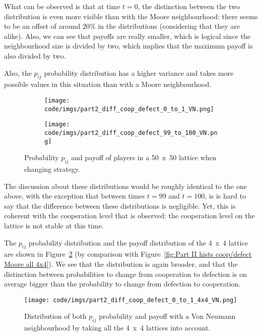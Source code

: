 \documentclass{article}
\begin{document}
What can be observed is that at time $t=0$, the distinction between the two distribution is even more visible
than with the Moore neighbourhood: there seems to be an offset of around $20\%$ in the distributions (considering
that they are alike). Also, we can see that payoffs are really smaller, which is logical since the neighbourhood
size is divided by two, which implies that the maximum payoff is also divided by two.

Also, the $p_{ij}$ probability distribution has a higher variance and takes more possible values in this situation
than with a Moore neighbourhood.

\begin{figure}
	\begin{subfigure}{\textwidth}
		\texttt{[image: code/imgs/part2\_diff\_coop\_defect\_0\_to\_1\_VN.png]}
	\end{subfigure}
	\begin{subfigure}{\textwidth}
		\texttt{[image: code/imgs/part2\_diff\_coop\_defect\_99\_to\_100\_VN.png]}
	\end{subfigure}
	\caption{Probability $p_{ij}$ and payoff of players in a 50~x~50 lattice when changing strategy.\label{fig:9}}
\end{figure}

The discussion about these distributions would be roughly identical to the one above, with the exception that
between times $t=99$ and $t=100$, is is hard to say that the difference between these distributions is negligible.
Yet, this is coherent with the cooperation level that is observed: the cooperation level on the lattice is
not stable at this time.

The $p_{ij}$ probability distribution and the payoff distribution of the 4~x~4 lattice are shown in
Figure~\ref{fig:hists coop/defect 4x4 VN} (by comparison with Figure~\ref{fig:Part II hists coop/defect Moore all 4x4}).
We see that the distribution is again broader, and that the distinction between probabilities to change from
cooperation to defection is on average bigger than the probability to change from defection to cooperation.

\begin{figure}[!t]
\hspace{-1.8cm}
\texttt{[image: code/imgs/part2\_diff\_coop\_defect\_0\_to\_1\_4x4\_VN.png]}
\caption{Distribution of both $p_{ij}$ probability and payoff with a Von Neumann neighbourhood by taking all the
4~x~4 lattices into account.\label{fig:hists coop/defect 4x4 VN}}
\end{figure}
\end{document}
